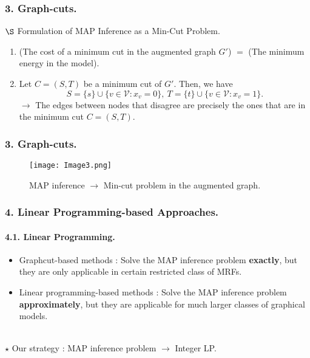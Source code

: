 \documentclass[11pt]{beamer}
\newtheorem*{pf of lemma}{\it Proof of the \normalfont \bf Lemma}
\newtheorem*{pf of claim}{\it Proof of the \normalfont \sf Claim}
\begin{document}
\begin{frame}
\frametitle{3. Graph-cuts.}

$\S$ Formulation of MAP Inference as a Min-Cut Problem. \\
\begin{enumerate}
\item (The cost of a minimum cut in the augmented graph $G'$) $=$ (The minimum energy in the model). \\
\item Let $C = (S, T)$ be a minimum cut of $G'$. Then, we have
$$S = \{s\} \cup \{v \in \mathcal{V} : x_v = 0 \},\ T = \{t\} \cup \{v \in \mathcal{V} : x_v = 1\}.$$
$\rightarrow$ The edges between nodes that disagree are precisely the ones that are in the minimum cut $C = (S, T)$.
\end{enumerate}

\end{frame}

\begin{frame}
\frametitle{3. Graph-cuts.}

\begin{example}

\begin{figure}[h]
\begin{center}
\texttt{[image: Image3.png]}
\caption{MAP inference $\rightarrow$ Min-cut problem in the augmented graph.}
\end{center}
\end{figure}

\end{example}

\end{frame}

\begin{frame}
\frametitle{4. Linear Programming-based Approaches.}
\framesubtitle{4.1. Linear Programming.}
 
\begin{itemize}
\item Graphcut-based methods : Solve the MAP inference problem \textbf{exactly}, but they are only applicable in certain restricted class of MRFs. \\
\item Linear programming-based methods : Solve the MAP inference problem \textbf{approximately}, but they are applicable for much larger classes of graphical models.
\end{itemize}

\ \\ $\star$ Our strategy : MAP inference problem $\rightarrow$ Integer LP.

\end{frame}
\end{document}
